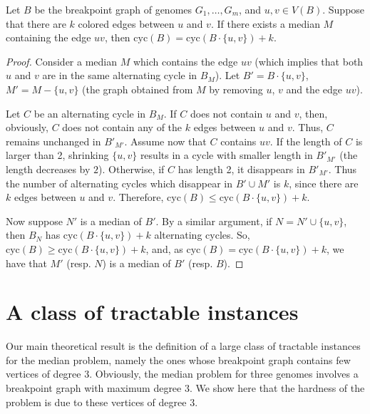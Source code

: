 \documentclass[10pt]{llncs}
\begin{document}
\begin{proposition} \label{Shrink}
  Let $B$ be the breakpoint graph of genomes $G_1, \ldots, G_m$, and
  $u, v \in V(B)$. Suppose that there are $k$ colored edges between
  $u$ and $v$. If there exists a median $M$ containing the edge $uv$,
  then $\text{cyc}(B) = \text{cyc}(B\cdot\{u, v\})+k$.
\end{proposition}

\begin{proof} 
 Consider a median $M$ which contains the edge $uv$ (which implies
 that both $u$ and $v$ are in the same alternating cycle in
 $B_M$). Let $B' = B\cdot\{u, v\}$, $M' = M - \{u, v\}$ (the graph
 obtained from $M$ by removing $u$, $v$ and the edge $uv$).

 Let $C$ be an alternating cycle in $B_M$. If $C$ does not contain $u$
 and $v$, then, obviously, $C$ does not contain any of the $k$ edges
 between $u$ and $v$. Thus, $C$ remains unchanged in $B'_{M'}$. Assume
 now that $C$ contains $uv$. If the length of $C$ is larger than 2,
 shrinking $\{u, v\}$ results in a cycle with smaller length in
 $B'_{M'}$ (the length decreases by $2$). Otherwise, if $C$ has length
 2, it disappears in $B'_{M'}$. Thus the number of alternating cycles
 which disappear in $B' \cup M'$ is $k$, since there are $k$ edges
 between $u$ and $v$. Therefore, $\text{cyc}(B) \leq
 \text{cyc}(B\cdot\{u, v\})+k$.
  
  Now suppose $N'$ is a median of $B'$.  By a similar argument, if $N
  = N' \cup \{u, v\}$, then $B_N$ has $\text{cyc}(B\cdot\{u, v\})+k$
  alternating cycles. So, $\text{cyc}(B) \geq \text{cyc}(B\cdot\{u,
  v\})+k$, and, as $\text{cyc}(B) = \text{cyc}(B\cdot\{u, v\})+k$, we
  have that $M'$ (resp. $N$) is a median of $B'$ (resp. $B$).  \end{proof}



\section{A class of tractable instances}\label{sec:results}

Our main theoretical result is the definition of a large class of
tractable instances for the median problem, namely the ones whose
breakpoint graph contains few vertices of degree $3$. Obviously, the
median problem for three genomes involves a breakpoint graph with
maximum degree $3$. We show here that the hardness of the problem is due
to these vertices of degree $3$.
\end{document}
